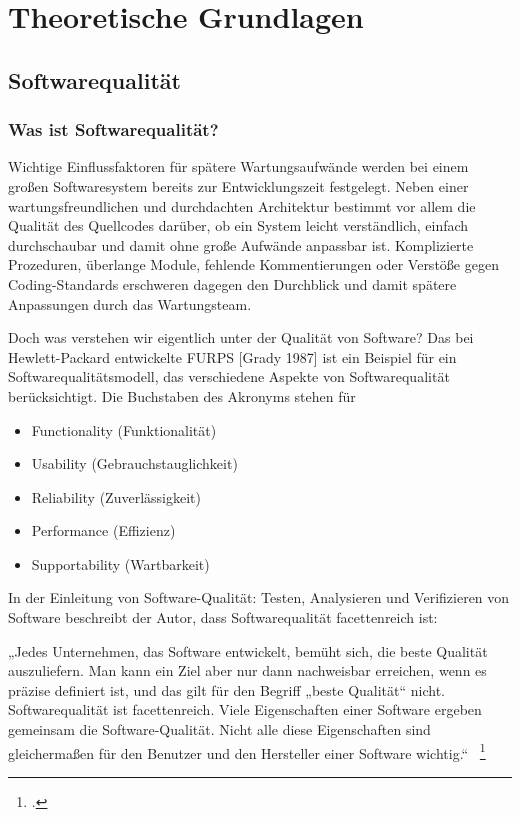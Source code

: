 \newpage
\section{Theoretische Grundlagen}

\subsection{Softwarequalität}
\subsubsection{Was ist Softwarequalität?} %
Wichtige Einflussfaktoren für spätere Wartungsaufwände werden bei einem großen Softwaresystem bereits zur Entwicklungszeit festgelegt. Neben einer wartungsfreundlichen und durchdachten Architektur
bestimmt vor allem die Qualität des Quellcodes darüber, ob ein System leicht verständlich, einfach durchschaubar und damit ohne große Aufwände anpassbar ist. Komplizierte Prozeduren, überlange Module, fehlende
Kommentierungen oder Verstöße gegen Coding-Standards erschweren dagegen den Durchblick und damit spätere Anpassungen durch das Wartungsteam.

Doch was verstehen wir eigentlich unter der Qualität von Software? Das bei Hewlett-Packard entwickelte FURPS [Grady 1987] ist ein Beispiel für ein Softwarequalitätsmodell, 
das verschiedene Aspekte von Softwarequalität berücksichtigt. Die Buchstaben des Akronyms stehen für 
\begin{itemize}
	\item Functionality (Funktionalität)
	\item Usability (Gebrauchstauglichkeit)
	\item Reliability (Zuverlässigkeit)
	\item Performance (Effizienz)
	\item Supportability (Wartbarkeit)
\end{itemize}

In der Einleitung von Software-Qualität: Testen, Analysieren und Verifizieren von Software beschreibt der Autor, dass Softwarequalität facettenreich ist:

„Jedes Unternehmen, das Software entwickelt, bemüht sich, die beste Qualität auszuliefern. Man kann ein Ziel aber nur dann nachweisbar erreichen, wenn es präzise definiert ist, und das gilt für den Begriff „beste Qualität“ nicht. Softwarequalität ist facettenreich. Viele Eigenschaften einer Software ergeben gemeinsam die Software-Qualität. Nicht alle diese Eigenschaften sind gleichermaßen für den Benutzer und den Hersteller einer Software wichtig.“ ~\footcite[S 1-3]{Liggesmeyer.2009}

